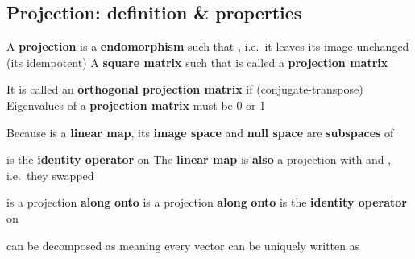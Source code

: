 \subsection*{Projection: definition \& properties}

\begin{itemize}
      \vItem
            A \textbf{projection}  is a \textbf{endomorphism}
            such that \iMbox{\ds \pi \circ \pi = \pi}, i.e.~it leaves its image
            unchanged (its idempotent)
      \vItem
            A \textbf{square matrix}  such that  is called
            a \textbf{projection matrix}

            \begin{itemize}

                  \vItem
                        It is called an \textbf{orthogonal projection matrix} if
                         (conjugate-transpose)
                  \vItem
                        Eigenvalues of a \textbf{projection matrix} must be 0 or 1
            \end{itemize}
      \vItem
            Because  is a \textbf{linear map}, its
            \textbf{image space}  and \textbf{null
                  space}  are \textbf{subspaces} of

            \begin{itemize}

                  \vItem
                        \iMbox{\pi} is the \textbf{identity operator} on 
                  \vItem
                        The \textbf{linear map}  is
                        \textbf{also} a projection with
                         and
                        , i.e.~they
                        swapped

                        \begin{itemize}

                              \vItem
                                    \iMbox{\pi} is a projection \textbf{along}  \textbf{onto}
                              \vItem
                                    \iMbox{\pi^{*}} is a projection \textbf{along} 
                                    \textbf{onto} 
                              \vItem
                                    \iMbox{\pi^{*}} is the \textbf{identity operator} on 
                        \end{itemize}
                  \vItem
                         can be decomposed as  meaning every
                        vector  can be uniquely written as 


\end{itemize}
\end{itemize}
